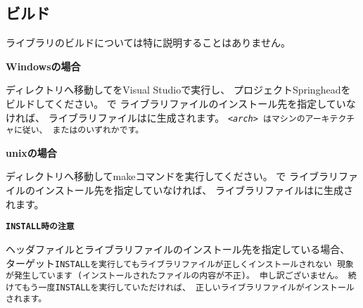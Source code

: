 \subsection{ビルド}
\label{subsec:Build}
\parindent=0pt

\noindent
ライブラリのビルドについては特に説明することはありません。

\medskip
\bf{Windowsの場合}
\begin{narrow}
	ディレクトリ\BldDir へ移動してをVisual Studioで実行し、
	プロジェクトSpringheadをビルドしてください。
	で
	ライブラリファイルのインストール先を指定していなければ、
	ライブラリファイルはに生成されます。
	\tt{<\it{arch}>} はマシンのアーキテクチャに従い、
	またはのいずれかです。
\end{narrow}

\bf{unixの場合}
\begin{narrow}
	ディレクトリ\BldDir へ移動してmakeコマンドを実行してください。
	で
	ライブラリファイルのインストール先を指定していなければ、
	ライブラリファイルはに生成されます。
\end{narrow}

\bigskip
\thinrule{\linewidth}

\bf{\tt{INSTALL}時の注意}

\begin{narrow}
ヘッダファイルとライブラリファイルのインストール先を指定している場合、
ターゲット\tt{INSTALL}を実行してもライブラリファイルが正しくインストールされない
現象が発生しています (インストールされたファイルの内容が不正)。
申し訳ございません。
続けてもう一度\tt{INSTALL}を実行していただければ、
正しいライブラリファイルがインストールされます。
\end{narrow}

\thinrule{\linewidth}

